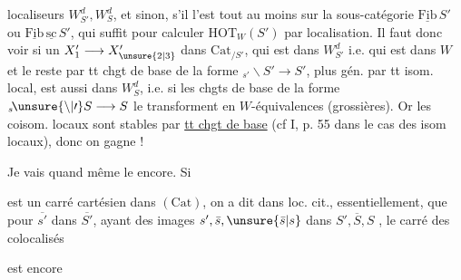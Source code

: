 
localiseurs $W^d_{S'},W^d_S$, et sinon, s'il l'est tout au moins sur la sous-catégorie $\underline{\mathrm{Fib}}\,S'$ ou $\underline{\mathrm{Fib}}\,\underline{\mathrm{sc}}\,S'$, qui suffit pour calculer $\mathrm{HOT}_W(S')$ par localisation. Il faut donc voir si un $X'_1\longrightarrow X'_{\unsure{2|3}}$ dans $\mathrm{Cat}_{/S'}$, qui est dans $W_{S'}^d$ i.e. qui est dans $W$ et le reste par tt chgt de base  de la forme $ {}_{s'}\!\backslash S'\longrightarrow S'$, plus gén. par tt isom. local, est aussi dans $W_S^d$, i.e. si les chgts de base de la forme $ {}_{s}\!\unsure{\backslash|\prime} S\longrightarrow S$ le transforment en $W$-équivalences (grossières). Or les  coisom. locaux sont stables par \uline{tt chgt de base} (cf I, p. 55 dans le cas  des isom locaux), donc on gagne !


Je vais quand même le  encore. Si


est un carré cartésien dans $(\mathrm{Cat})$, on a dit dans loc. cit., essentiellement, que pour $\overline{s'}$ dans $\overline{S'}$, ayant des images $s',\bar s,\unsure{\bar s|s}$ dans $S',\overline S,S$ , le carré des colocalisés


est encore
